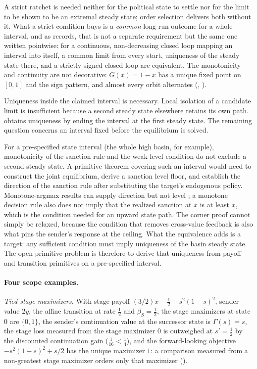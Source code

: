 A strict ratchet is needed neither for the political state to settle nor for the
limit to be shown to be an extremal steady state; order selection delivers both
without it. What a strict condition buys is a \emph{common} long-run outcome for
a whole interval, and as  records, that is not a separate
requirement but the same one written pointwise: for a continuous, non-decreasing
closed loop mapping an interval into itself, a common limit from every start,
uniqueness of the steady state there, and a strictly signed closed loop are
equivalent. The monotonicity and continuity are not decorative: $G(x)=1-x$ has a
unique fixed point on $[0,1]$ and the sign pattern, and almost every orbit
alternates (,
).

Uniqueness inside the claimed interval is necessary. Local isolation of a
candidate limit is insufficient because a second steady state elsewhere retains
its own path.  obtains uniqueness by ending the
interval at the first steady state. The remaining question concerns an interval
fixed before the equilibrium is solved.

For a pre-specified state interval (the whole high basin, for example),
monotonicity of the sanction rule and the weak level condition do not exclude a
second steady state. A primitive theorem covering such an interval would need to
construct the joint equilibrium, derive a sanction level floor, and establish the
direction of the sanction rule after substituting the target's endogenous
policy. Monotone-argmax
results can supply direction but not level
\citep{MilgromShannon1994,QuahStrulovici2009}; a monotone decision rule also does
not imply that the realized sanction at $x$ is at least $x$, which is the
condition needed for an upward state path. The corner proof cannot simply be
relaxed, because the condition that removes cross-value feedback is also what pins
the sender's response at the ceiling. What the equivalence adds is a target:
any sufficient condition must imply uniqueness of the basin steady state. The
open primitive problem is therefore to derive that uniqueness from payoff and
transition primitives on a pre-specified interval.

\paragraph{Four scope examples.}
\emph{Tied stage maximizers.} With stage payoff $(3/2)x-\tfrac12-s^2(1-s)^2$,
sender value $2y$, the affine transition at rate $\tfrac12$ and $\beta_S=\tfrac12$,
the stage maximizers at state $0$ are $\{0,1\}$, the sender's continuation value at the successor state is
$\Gamma(s)=s$, the stage loss measured from the stage maximizer $0$ is outweighed at $s'=\tfrac12$ by the discounted continuation gain
($\tfrac1{16}<\tfrac14$), and the forward-looking objective
$-s^2(1-s)^2+s/2$ has the unique maximizer $1$: a comparison measured from a non-greatest stage
maximizer orders only that maximizer ().

